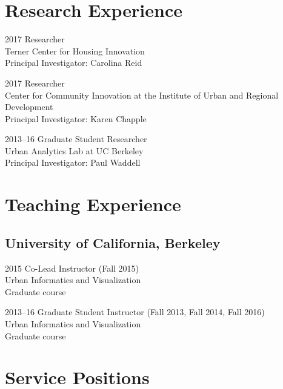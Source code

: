 \documentclass{academiccv}
\begin{document}
\section*{Research Experience}

\begin{tablist}
\item[2017] 	\tab Researcher \\
			   		 Terner Center for Housing Innovation \\
					 Principal Investigator: Carolina Reid
\item[2017] 	\tab Researcher \\
	                 Center for Community Innovation at the Institute of Urban and Regional Development \\
	                 Principal Investigator: Karen Chapple
\item[2013--16] \tab Graduate Student Researcher \\
                     Urban Analytics Lab at UC Berkeley \\
                     Principal Investigator: Paul Waddell
\end{tablist}



\section*{Teaching Experience}

\subsection*{University of California, Berkeley}

\begin{tablist}
\item[2015]		\tab Co-Lead Instructor (Fall 2015) \\
                     Urban Informatics and Visualization \\
                     Graduate course
\item[2013--16] \tab Graduate Student Instructor (Fall 2013, Fall 2014, Fall 2016) \\
                     Urban Informatics and Visualization \\
                     Graduate course
\end{tablist}



\section*{Service Positions}
\end{document}
